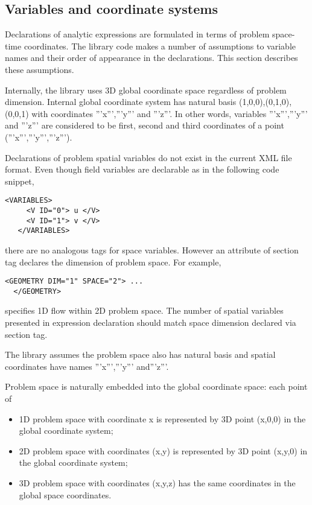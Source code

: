 \subsection{Variables and coordinate systems}
Declarations of analytic expressions are formulated in terms of problem
space-time coordinates. The library code makes a number of assumptions to
variable names and their order of appearance in the declarations. This section
describes these assumptions.

Internally, the library uses 3D global coordinate space regardless of problem
dimension. Internal global coordinate system has natural basis
{{{(1,0,0),(0,1,0),(0,0,1)}}} with coordinates '''x''','''y''' and '''z'''. In
other words, variables '''x''','''y''' and '''z''' are considered to be first,
second and third coordinates of a point ('''x''','''y''','''z''').

Declarations of problem spatial variables do not exist in the current XML file
format. Even though field variables are declarable as in the following code
snippet, 
\begin{lstlisting}[style=XMLStyle]
   <VARIABLES>
     <V ID="0"> u </V>
     <V ID="1"> v </V>
   </VARIABLES>
\end{lstlisting} 
there are no analogous tags for space variables. However an attribute
 of  section tag declares the dimension of
problem space. For example, \begin{lstlisting}[style=XMLStyle]
  <GEOMETRY DIM="1" SPACE="2"> ...
  </GEOMETRY>
\end{lstlisting}
specifies 1D flow within 2D problem space. The number of spatial variables
presented in expression declaration should match space dimension declared via
 section tag.

The library assumes the problem space also has natural basis and spatial
coordinates have names '''x''','''y''' and'''z'''.

Problem space is naturally embedded into the global coordinate space: each point
of
\begin{itemize}
\item 1D problem space with coordinate {{{x}}} is represented by 3D point
 {{{(x,0,0)}}} in the global coordinate system;
\item 2D problem space with coordinates {{{(x,y)}}} is represented by 3D point 
 {{{(x,y,0)}}} in the global coordinate system;
\item 3D problem space with coordinates {{{(x,y,z)}}} has the
 same coordinates in the global space coordinates.
\end{itemize}

